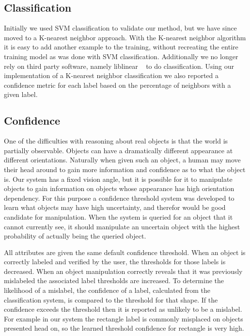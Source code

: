\documentclass[11pt]{article}
\begin{document}
\subsection{Classification}
Initially we used SVM classification to validate our method, but we have since
moved to a K-nearest neighbor approach.  With the K-nearest neighbor algorithm
it is easy to add another example to the training, without recreating the
entire training model as was done with SVM classification.  Additionally we no
longer rely on third party software, namely liblinear ~\cite{LIBLINEAR} to do
classification.  Using our implementation of a K-nearest neighbor
classification we also reported a confidence metric for each label based on the
percentage of neighbors with a given label.

\subsection{Confidence}
One of the difficulties with reasoning about real objects is that the world is
partially observable. Objects can have a dramatically different appearance at
different orientations.  Naturally when given such an object, a human may move
their head around to gain more information and confidence as to what the object is.
Our system has a fixed vision angle, but it is possible for it to
manipulate objects to gain information on objects whose appearance has high
orientation dependency.  For this purpose a confidence threshold system was
developed to learn what objects may have high uncertainty, and therefor would
be good candidate for manipulation.  When the system is queried for an object
that it cannot currently see, it should manipulate an uncertain object with the
highest probability of actually being the queried object.

All attributes are given the same default confidence threshold.  When an object
is correctly labeled and verified by the user, the thresholds for those labels
is decreased.  When an object manipulation correctly reveals that it was
previously mislabeled the associated label thresholds are increased.  To
determine the likelihood of a mislabel, the confidence of a label, calculated
from the classification system, is compared to the threshold for that shape.
If the confidence exceeds the threshold then it is reported as unlikely to be a
mislabel.  For example in our system the rectangle label is commonly misplaced
on objects presented head on, so the learned threshold confidence for rectangle
is very high.
\end{document}
